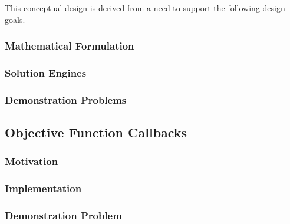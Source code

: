 This conceptual design is derived from a need to support the following \Cyclus
design goals.




\subsubsection{Mathematical Formulation}
\subsubsection{Solution Engines}
\subsubsection{Demonstration Problems}
\subsection{Objective Function Callbacks}\label{subsection:callback}

\subsubsection{Motivation}
\subsubsection{Implementation}
\subsubsection{Demonstration Problem}

